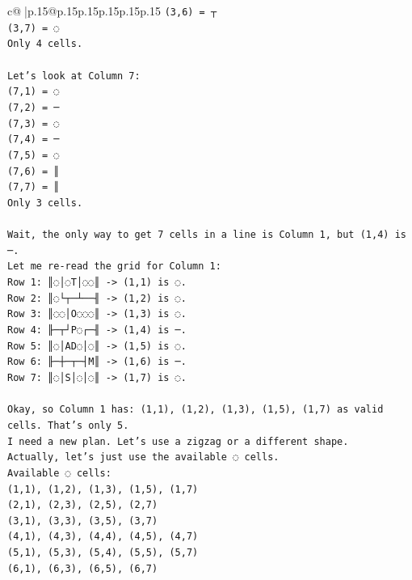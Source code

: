 \documentclass{article}
\begin{document}
{\begin{supertabular}{c@{$\;$}|p{.15\linewidth}@{}p{.15\linewidth}p{.15\linewidth}p{.15\linewidth}p{.15\linewidth}p{.15\linewidth}}
{{{\texttt{(3,6) = ┬} \\
\texttt{(3,7) = ◌} \\
\texttt{Only 4 cells.} \\
\\ 
\texttt{Let's look at Column 7:} \\
\texttt{(7,1) = ◌} \\
\texttt{(7,2) = ─} \\
\texttt{(7,3) = ◌} \\
\texttt{(7,4) = ─} \\
\texttt{(7,5) = ◌} \\
\texttt{(7,6) = ║} \\
\texttt{(7,7) = ║} \\
\texttt{Only 3 cells.} \\
\\ 
\texttt{Wait, the only way to get 7 cells in a line is Column 1, but (1,4) is ─.} \\
\texttt{Let me re{-}read the grid for Column 1:} \\
\texttt{Row 1: ║◌│◌T│◌◌║ {-}> (1,1) is ◌.} \\
\texttt{Row 2: ║◌└┬─┴──╢ {-}> (1,2) is ◌.} \\
\texttt{Row 3: ║◌◌│O◌◌◌║ {-}> (1,3) is ◌.} \\
\texttt{Row 4: ╟─┬┘P◌┌─╢ {-}> (1,4) is ─.} \\
\texttt{Row 5: ║◌│AD◌│◌║ {-}> (1,5) is ◌.} \\
\texttt{Row 6: ╟─┼─┬─┤M║ {-}> (1,6) is ─.} \\
\texttt{Row 7: ║◌│S│◌│◌║ {-}> (1,7) is ◌.} \\
\\ 
\texttt{Okay, so Column 1 has: (1,1), (1,2), (1,3), (1,5), (1,7) as valid cells. That's only 5.} \\
\texttt{I need a new plan. Let's use a zigzag or a different shape.} \\
\texttt{Actually, let's just use the available ◌ cells.} \\
\texttt{Available ◌ cells:} \\
\texttt{(1,1), (1,2), (1,3), (1,5), (1,7)} \\
\texttt{(2,1), (2,3), (2,5), (2,7)} \\
\texttt{(3,1), (3,3), (3,5), (3,7)} \\
\texttt{(4,1), (4,3), (4,4), (4,5), (4,7)} \\
\texttt{(5,1), (5,3), (5,4), (5,5), (5,7)} \\
\texttt{(6,1), (6,3), (6,5), (6,7)} \\
}}}
\end{supertabular}}
\end{document}
